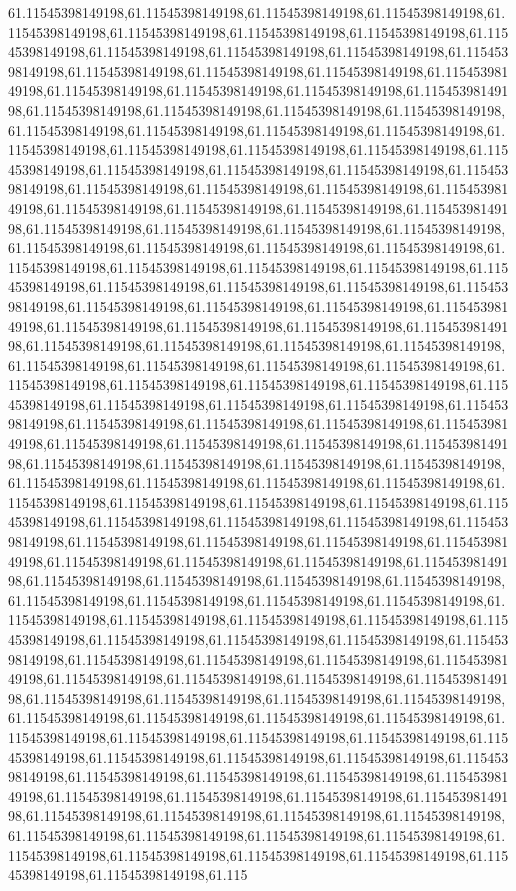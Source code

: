 61.11545398149198,61.11545398149198,61.11545398149198,61.11545398149198,61.11545398149198,61.11545398149198,61.11545398149198,61.11545398149198,61.11545398149198,61.11545398149198,61.11545398149198,61.11545398149198,61.11545398149198,61.11545398149198,61.11545398149198,61.11545398149198,61.11545398149198,61.11545398149198,61.11545398149198,61.11545398149198,61.11545398149198,61.11545398149198,61.11545398149198,61.11545398149198,61.11545398149198,61.11545398149198,61.11545398149198,61.11545398149198,61.11545398149198,61.11545398149198,61.11545398149198,61.11545398149198,61.11545398149198,61.11545398149198,61.11545398149198,61.11545398149198,61.11545398149198,61.11545398149198,61.11545398149198,61.11545398149198,61.11545398149198,61.11545398149198,61.11545398149198,61.11545398149198,61.11545398149198,61.11545398149198,61.11545398149198,61.11545398149198,61.11545398149198,61.11545398149198,61.11545398149198,61.11545398149198,61.11545398149198,61.11545398149198,61.11545398149198,61.11545398149198,61.11545398149198,61.11545398149198,61.11545398149198,61.11545398149198,61.11545398149198,61.11545398149198,61.11545398149198,61.11545398149198,61.11545398149198,61.11545398149198,61.11545398149198,61.11545398149198,61.11545398149198,61.11545398149198,61.11545398149198,61.11545398149198,61.11545398149198,61.11545398149198,61.11545398149198,61.11545398149198,61.11545398149198,61.11545398149198,61.11545398149198,61.11545398149198,61.11545398149198,61.11545398149198,61.11545398149198,61.11545398149198,61.11545398149198,61.11545398149198,61.11545398149198,61.11545398149198,61.11545398149198,61.11545398149198,61.11545398149198,61.11545398149198,61.11545398149198,61.11545398149198,61.11545398149198,61.11545398149198,61.11545398149198,61.11545398149198,61.11545398149198,61.11545398149198,61.11545398149198,61.11545398149198,61.11545398149198,61.11545398149198,61.11545398149198,61.11545398149198,61.11545398149198,61.11545398149198,61.11545398149198,61.11545398149198,61.11545398149198,61.11545398149198,61.11545398149198,61.11545398149198,61.11545398149198,61.11545398149198,61.11545398149198,61.11545398149198,61.11545398149198,61.11545398149198,61.11545398149198,61.11545398149198,61.11545398149198,61.11545398149198,61.11545398149198,61.11545398149198,61.11545398149198,61.11545398149198,61.11545398149198,61.11545398149198,61.11545398149198,61.11545398149198,61.11545398149198,61.11545398149198,61.11545398149198,61.11545398149198,61.11545398149198,61.11545398149198,61.11545398149198,61.11545398149198,61.11545398149198,61.11545398149198,61.11545398149198,61.11545398149198,61.11545398149198,61.11545398149198,61.11545398149198,61.11545398149198,61.11545398149198,61.11545398149198,61.11545398149198,61.11545398149198,61.11545398149198,61.11545398149198,61.11545398149198,61.11545398149198,61.11545398149198,61.11545398149198,61.11545398149198,61.11545398149198,61.11545398149198,61.11545398149198,61.11545398149198,61.11545398149198,61.11545398149198,61.11545398149198,61.11545398149198,61.11545398149198,61.11545398149198,61.11545398149198,61.11545398149198,61.11545398149198,61.11545398149198,61.11545398149198,61.11545398149198,61.11545398149198,61.11545398149198,61.11545398149198,61.11545398149198,61.11545398149198,61.11545398149198,61.11545398149198,61.11545398149198,61.11545398149198,61.11545398149198,61.115